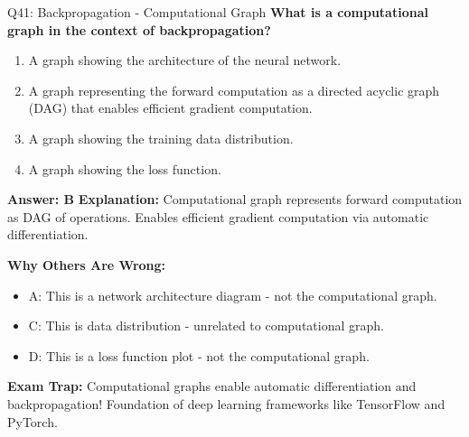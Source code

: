 \documentclass[8pt]{beamer}
\begin{document}
	\begin{frame}{Q41: Backpropagation - Computational Graph}
		\fontsize{6.5}{7.5}\selectfont
		\textbf{What is a computational graph in the context of backpropagation?}
		
		\begin{enumerate}
			\item A graph showing the architecture of the neural network.
			\item A graph representing the forward computation as a directed acyclic graph (DAG) that enables efficient gradient computation.
			\item A graph showing the training data distribution.
			\item A graph showing the loss function.
		\end{enumerate}
		
		\vspace{0.05cm}
		\textcolor{myblue}{\textbf{Answer: B}}
		\vspace{0.05cm}
		\textcolor{myblue}{\textbf{Explanation:}} Computational graph represents forward computation as DAG of operations. Enables efficient gradient computation via automatic differentiation.
		
		\vspace{0.05cm}
		\textcolor{myred}{\textbf{Why Others Are Wrong:}}
		\begin{itemize}
			\item \textcolor{myred}{A:} This is a network architecture diagram - not the computational graph.
			\item \textcolor{myred}{C:} This is data distribution - unrelated to computational graph.
			\item \textcolor{myred}{D:} This is a loss function plot - not the computational graph.
		\end{itemize}
		
		\textcolor{myred}{\textbf{Exam Trap:}} Computational graphs enable \textcolor{myblue}{automatic differentiation} and backpropagation! Foundation of deep learning frameworks like TensorFlow and PyTorch.
	\end{frame}
	
\end{document}
